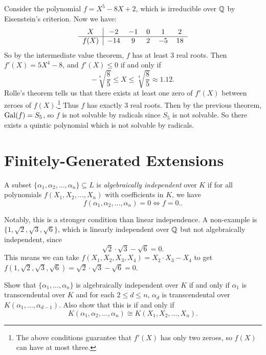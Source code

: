 \begin{example}
  Consider the polynomial $f = X^5 - 8X + 2$, which
  is irreducible over $\mathbb{Q}$ by Eisenstein's criterion.
  Now we have:
  \[
    \begin{tabular}
      {c|ccccc}
      $X$ & $-2$ & $-1$ & $0$ & $1$ & $2$ \\
      \hline
      $f(X)$ & $-14$ & $9$ & $2$ & $-5$ & $18$
    \end{tabular}
  \]
  So by the intermediate value theorem, $f$ has
  at least $3$ real roots. Then $f'(X) = 5X^4 - 8$, and
  $f'(X) \le 0$ if and only if
  \[
    -\sqrt[4]{\frac{8}{5}} \le X \le \sqrt[4]{\frac{8}{5}}
    \approx 1.12.
  \]
  Rolle's theorem tells us that there exists at least
  one zero of $f'(X)$ between zeroes of $f(X)$.\footnote{The above conditions guarantee that $f'(X)$ has only two zeroes, so $f(X)$ can have at most three.} Thus
  $f$ has exactly $3$ real roots. Then by the previous
  theorem, $\operatorname{Gal}(f) = S_5$, so $f$ is not solvable
  by radicals since $S_5$ is not solvable. So there
  exists a quintic polynomial which is not solvable
  by radicals.
\end{example}

\section{Finitely-Generated Extensions}

\begin{definition}
  A subset $\{\alpha_1, \alpha_2, \dots, \alpha_n\} \subseteq L$
  is \emph{algebraically independent} over $K$ if
  for all polynomials $f(X_1, X_2, \dots, X_n)$ with
  coefficients in $K$, we have
  \[
    f(\alpha_1, \alpha_2, \dots, \alpha_n) = 0
    \iff f = 0..
  \]
\end{definition}

\begin{example}
  Notably, this is a stronger condition than linear
  independence. A non-example is
  $\{1, \sqrt{2}, \sqrt{3}, \sqrt{6}\}$, which is linearly
  independent over $\mathbb{Q}$ but not algebraically independent,
  since
  \[
    \sqrt{2} \cdot \sqrt{3} - \sqrt{6} = 0.
  \]
  This means we can take $f(X_1, X_2, X_3, X_4) = X_2 \cdot X_3 - X_4$ to
  get $f(1, \sqrt{2}, \sqrt{3}, \sqrt{6}) = \sqrt{2} \cdot \sqrt{3} - \sqrt{6} = 0$.
\end{example}

\begin{exercise}
  Show that $\{\alpha_1, \dots, \alpha_n\}$  is algebraically
  independent over $K$ if and only if
  $\alpha_1$ is transcendental over $K$ and for each
  $2 \le d \le n$, $\alpha_d$ is transcendental over
  $K(\alpha_1, \dots, \alpha_{d - 1})$. Also show that
  this is if and only if
  \[
    K(\alpha_1, \alpha_2, \dots, \alpha_n) \cong K(X_1, X_2, \dots, X_n).
  \]
\end{exercise}

